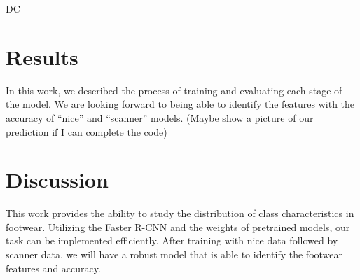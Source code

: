 \documentclass[10pt]{article}
\begin{document}
DC 

 

\section{Results}

In this work, we described the process of training and evaluating each stage of the model. We are looking forward to being able to identify the features with the accuracy of “nice” and “scanner” models.  (Maybe show a picture of our prediction if I can complete the code) 

 

\section{Discussion }
This work provides the ability to study the distribution of class characteristics in footwear. Utilizing the Faster R-CNN and the weights of pretrained models, our task can be implemented efficiently. After training with nice data followed by scanner data, we will have a robust model that is able to identify the footwear features and accuracy.

 
\end{document}
